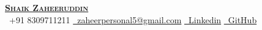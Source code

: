 \begin{center}
    \textbf{{\href{https://github.com/developer0009}{ \Huge \scshape Shaik Zaheeruddin}}} \\ \vspace{1pt}
    \faPhone \ \small +91 8309711211 \quad
    \href{mailto:zaheerpersonal5@gmail.com}{\faEnvelope \ zaheerpersonal5@gmail.com} \quad
    \href{https://www.linkedin.com/in/shaik-zaheeruddin-252405217/}{\faLinkedin \ Linkedin} \quad
    \href{https://github.com/shaik-zaheeruddin}{\faGithub \ GitHub}
\end{center}

